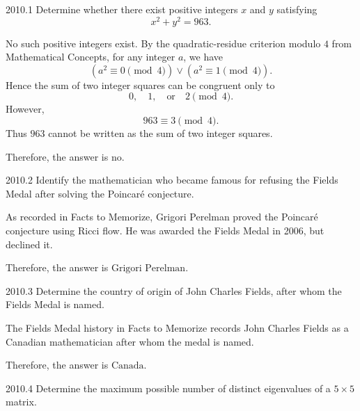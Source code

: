     \begin{pastproblem}{2010.1}
        Determine whether there exist positive integers $x$ and $y$ satisfying
        \[
            x^2+y^2=963.
        \]
    \end{pastproblem}

    \begin{solution}
        No such positive integers exist. By the quadratic-residue criterion modulo $4$ from Mathematical Concepts, for any integer $a$, we have
        \[
            (a^2\equiv 0\pmod{4})\lor(a^2\equiv 1\pmod{4}).
        \]
        Hence the sum of two integer squares can be congruent only to
        \[
            0,\quad 1,\quad \text{or}\quad 2\pmod{4}.
        \]
        However,
        \[
            963\equiv 3\pmod{4}.
        \]
        Thus $963$ cannot be written as the sum of two integer squares.

        Therefore, the answer is $\boxed{\text{no}}$.
    \end{solution}

    \begin{pastproblem}{2010.2}
        Identify the mathematician who became famous for refusing the Fields Medal after solving the
        Poincar\'e conjecture.
    \end{pastproblem}

    \begin{solution}
        As recorded in Facts to Memorize, Grigori Perelman proved the Poincar\'e
        conjecture using Ricci flow. He was awarded the Fields Medal in 2006, but
        declined it.

        Therefore, the answer is $\boxed{\text{Grigori Perelman}}$.
    \end{solution}

    \begin{pastproblem}{2010.3}
        Determine the country of origin of John Charles Fields, after whom the Fields Medal is
        named.
    \end{pastproblem}

    \begin{solution}
        The Fields Medal history in Facts to Memorize records John Charles Fields
        as a Canadian mathematician after whom the medal is named.

        Therefore, the answer is $\boxed{\text{Canada}}$.
    \end{solution}

    \begin{pastproblem}{2010.4}
        Determine the maximum possible number of distinct eigenvalues of a $5\times 5$ matrix.
    \end{pastproblem}

